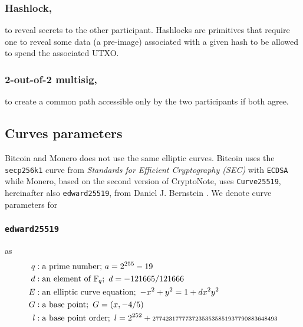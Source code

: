\documentclass{llncs}
\begin{document}
\subsubsection{Hashlock,}
to reveal secrets to the other participant. Hashlocks are primitives that require one to reveal some data (a pre-image) associated with a given hash to be allowed to spend the associated UTXO.

\subsubsection{2-out-of-2 multisig,}
to create a common path accessible only by the two participants if both agree.

\subsection{Curves parameters}
\label{curveParams}
Bitcoin and Monero does not use the same elliptic curves. Bitcoin uses the \texttt{secp256k1} curve from \textit{Standards for Efficient Cryptography (SEC)} with \texttt{ECDSA} while Monero, based on the second version of CryptoNote, uses \texttt{Curve25519}, hereinafter also \texttt{edward25519}, from Daniel J. Bernstein \cite{CerRes10, van2013cryptonote}. We denote curve parameters for

\subsubsection{\texttt{edward25519}} as
\begin{equation}
\begin{split}
    q&: \text{a prime number;}\ a = 2^{255} - 19 \\
    d&: \text{an element of } \mathbb{F}_q;\ d = - 121665/121666 \\
    E&: \text{an elliptic curve equation};\ -x^2 + y^2 = 1 + dx^2y^2 \\
    G&: \text{a base point};\ G = (x, -4/5) \\
    l&: \text{a base point order};\ l = 2^{252} + \text{\scriptsize27742317777372353535851937790883648493} \\
\end{split}
\end{equation}
\end{document}
